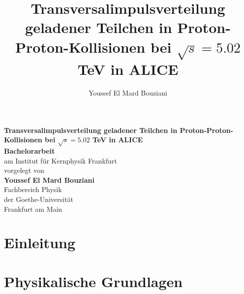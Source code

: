\documentclass[12pt,a4paper]{report}
\author{Youssef El Mard Bouziani}
\title{Transversalimpulsverteilung geladener Teilchen in Proton-Proton-Kollisionen bei  $\sqrt{s} = 5.02$ TeV in ALICE}
\begin{document}
\begin{titlepage}
\begin{center}

\vspace*{5cm}  

\huge{\textbf{Transversalimpulsverteilung geladener Teilchen in Proton-Proton-Kollisionen bei  $\sqrt{s} = 5.02$ TeV in ALICE}}\\[2cm]
\vfill
\Large{\textbf{Bachelorarbeit}}\\
am Institut für Kernphysik Frankfurt\\
\vfill
vorgelegt von\\[1cm]
\Large{\textbf{Youssef El Mard Bouziani}}\\[1cm]
\vfill
Fachbereich Physik\\
der Goethe-Universität\\
Frankfurt am Main\\

\end{center}
\end{titlepage}
\tableofcontents
\chapter{Einleitung}
\chapter{Physikalische Grundlagen}
\label{cha:PGrundlagen}
\end{document}
